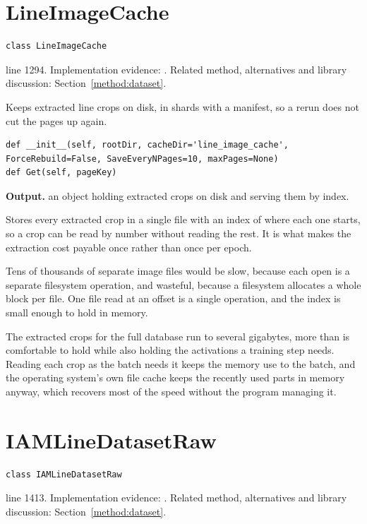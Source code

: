 \section{LineImageCache}\label{fn:train:LineImageCache}
\begin{lstlisting}[style=sig]
class LineImageCache
\end{lstlisting}
 line 1294. Implementation evidence: \cite{code2026}. Related method, alternatives and library discussion: Section~\ref{method:dataset}.


Keeps extracted line crops on disk, in shards with a manifest, so a rerun does not cut the pages up again.


\begin{lstlisting}[style=plain]
def __init__(self, rootDir, cacheDir='line_image_cache', ForceRebuild=False, SaveEveryNPages=10, maxPages=None)
def Get(self, pageKey)
\end{lstlisting}


\noindent\textbf{Output.} an object holding extracted crops on disk and serving them by index.


Stores every extracted crop in a single file with an index of where each one starts, so a crop can be read by number without reading the rest. It is what makes the extraction cost payable once rather than once per epoch.


Tens of thousands of separate image files would be slow, because each open is a separate filesystem operation, and wasteful, because a filesystem allocates a whole block per file. One file read at an offset is a single operation, and the index is small enough to hold in memory.


The extracted crops for the full database run to several gigabytes, more than is comfortable to hold while also holding the activations a training step needs. Reading each crop as the batch needs it keeps the memory use to the batch, and the operating system's own file cache keeps the recently used parts in memory anyway, which recovers most of the speed without the program managing it.



\section{IAMLineDatasetRaw}\label{fn:train:IAMLineDatasetRaw}
\begin{lstlisting}[style=sig]
class IAMLineDatasetRaw
\end{lstlisting}
 line 1413. Implementation evidence: \cite{code2026}. Related method, alternatives and library discussion: Section~\ref{method:dataset}.


